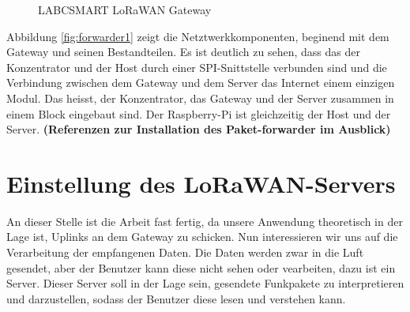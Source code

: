\begin{figure}[h!]
	\centering
	\caption{LABCSMART LoRaWAN Gateway}
\end{figure}


Abbildung \ref{fig:forwarder1} zeigt die Netztwerkkomponenten, beginend
mit dem Gateway und seinen Bestandteilen. Es ist deutlich zu sehen, dass
das der Konzentrator und der Host durch einer SPI-Snittstelle verbunden
sind und die Verbindung zwischen dem Gateway und dem Server das Internet
einem einzigen Modul. Das heisst, der Konzentrator, das Gateway und der
Server zusammen in einem Block eingebaut sind. Der Raspberry-Pi ist
gleichzeitig der Host und der Server. \textbf{(Referenzen zur
Installation des Paket-forwarder im Ausblick)}

\section{Einstellung des LoRaWAN-Servers}\label{server}

An dieser Stelle ist die Arbeit fast fertig, da unsere Anwendung
theoretisch in der Lage ist, Uplinks an dem Gateway zu schicken. Nun
interessieren wir uns auf die Verarbeitung der empfangenen Daten. Die
Daten werden zwar in die Luft gesendet, aber der Benutzer kann diese
nicht sehen oder vearbeiten, dazu ist ein Server. Dieser Server soll in
der Lage sein, gesendete Funkpakete zu interpretieren und darzustellen,
sodass der Benutzer diese lesen und verstehen kann. 

